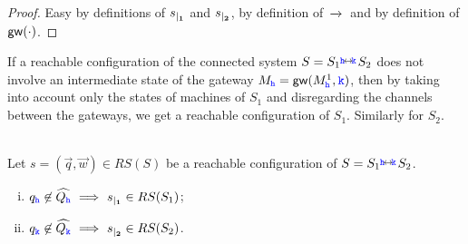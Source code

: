 \begin{proof}
Easy by definitions of ${s}_{\mid_{\mathbf{1}}}$ and ${s}_{\mid_{\mathbf{2}}}$, by definition of $\,\xrightarrow{}_{{}}\,$ and by definition of 
$\mathsf{gw}(\cdot)$.
\end{proof}



If a reachable configuration of the connected system $S={S_{1}}\stackrel{\hspace{-3pt}{ \ensuremath{\mathtt{\color{blue}{ {h}}}} }\!\leftrightarrow\!{\mathtt{\color{blue}{ {k}}}}\!}{} {S_{2}}$ does not involve an intermediate state of the gateway
$M_{\mathtt{\color{blue}{ {h}}}} = \mathsf{gw}(M^1_{\mathtt{\color{blue}{ {h}}}}, {\mathtt{\color{blue}{ {k}}}})$, %
then by taking into account only the states of machines of $S_1$ and disregarding
the channels between the gateways, %
we get a
reachable configuration of $S_1$. Similarly for $S_2$.

\begin{lemma}
\label{lem:nohatrestrict}\hfill\\
Let $s= (\vec{q},\vec{w}) \in RS(S)$ be a reachable configuration of $S ={S_{1}}\stackrel{\hspace{-3pt}{ \ensuremath{\mathtt{\color{blue}{ {h}}}} }\!\leftrightarrow\!{\mathtt{\color{blue}{ {k}}}}\!}{} {S_{2}}$.
\begin{enumerate}[i)]
\item
\label{lem:nohatrestrict-i}
${q}_{\mathtt{\color{blue}{ {h}}}}\not\in\widehat{Q_{\mathtt{\color{blue}{ {h}}}}} ~\Longrightarrow~ 
{s}_{\mid_{\mathbf{1}}}\in RS(S_1)$;
\item
\label{lem:nohatrestrict-ii}
${q}_{\mathtt{\color{blue}{ {k}}}}\not\in\widehat{Q_{\mathtt{\color{blue}{ {k}}}}} ~\Longrightarrow~ 
{s}_{\mid_{\mathbf{2}}}\in RS(S_2)$.
\end{enumerate}
\end{lemma}


